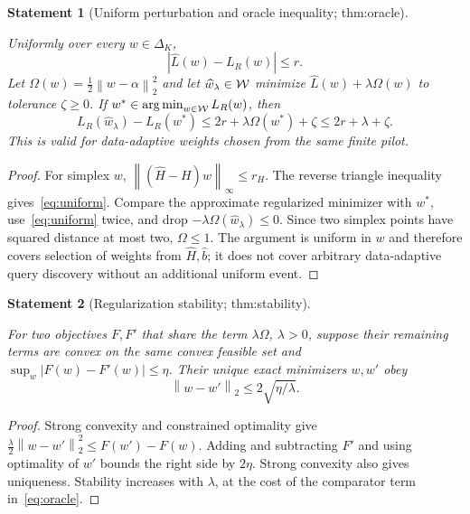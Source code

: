 \documentclass[11pt]{article}
\newtheorem{statement}{Statement}
\newcommand{\argmin}{\operatorname*{arg\,min}}
\newcommand{\norm}[1]{\left\lVert#1\right\rVert}\newcommand{\qh}{\widehat H}
\newcommand{\bh}{\widehat b}\newcommand{\calL}{\mathcal L}\newcommand{\eps}{\varepsilon}
\begin{document}
\begin{statement}[Uniform perturbation and oracle inequality; thm:oracle]\label{thm:oracle}

Uniformly over every $w\in\Delta_K$,
\begin{equation}\label{eq:uniform}
|\widehat L(w)-L_R(w)|\le r.
\end{equation}
Let $\Omega(w)=\frac12\norm{w-\alpha}_2^2$ and let $\widehat w_\lambda\in\mathcal W$ minimize $\widehat L(w)+\lambda\Omega(w)$ to tolerance $\zeta\ge0$. If $w^*\in\argmin_{w\in\W}L_R(w)$, then
\begin{equation}\label{eq:oracle}
L_R(\widehat w_\lambda)-L_R(w^*)
\le2r+\lambda\Omega(w^*)+\zeta\le2r+\lambda+\zeta.
\end{equation}
This is valid for data-adaptive weights chosen from the same finite pilot.

\end{statement}

\begin{proof}
For simplex $w$, $\norm{(\qh-H)w}_\infty\le r_H$. The reverse triangle inequality gives~\eqref{eq:uniform}. Compare the approximate regularized minimizer with $w^*$, use~\eqref{eq:uniform} twice, and drop $-\lambda\Omega(\widehat w_\lambda)\le0$. Since two simplex points have squared distance at most two, $\Omega\le1$. The argument is uniform in $w$ and therefore covers selection of weights from $\qh,\bh$; it does not cover arbitrary data-adaptive query discovery without an additional uniform event.
\end{proof}

\begin{statement}[Regularization stability; thm:stability]\label{thm:stability}

For two objectives $F,F'$ that share the term $\lambda\Omega$, $\lambda>0$, suppose their remaining terms are convex on the same convex feasible set and $\sup_w|F(w)-F'(w)|\le\eta$. Their unique exact minimizers $w,w'$ obey
\begin{equation}
\norm{w-w'}_2\le2\sqrt{\eta/\lambda}.
\end{equation}

\end{statement}

\begin{proof}
Strong convexity and constrained optimality give
$\frac\lambda2\norm{w-w'}_2^2\le F(w')-F(w)$.
Adding and subtracting $F'$ and using optimality of $w'$ bounds the right side by $2\eta$. Strong convexity also gives uniqueness. Stability increases with $\lambda$, at the cost of the comparator term in~\eqref{eq:oracle}.
\end{proof}
\end{document}
